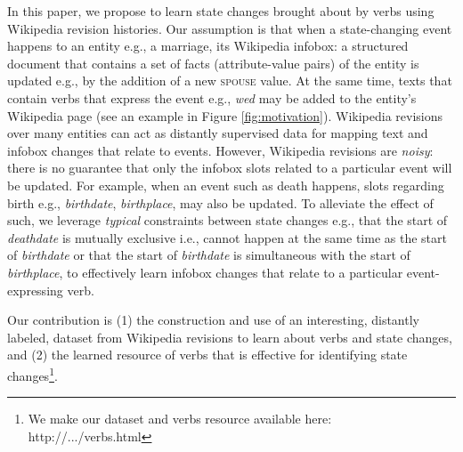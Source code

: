 In this paper, we propose to learn state changes brought about by verbs using Wikipedia revision histories. Our assumption is that when a state-changing event happens to an entity e.g., a marriage, its Wikipedia infobox: a structured document that contains a set of facts (attribute-value pairs) of the entity is updated e.g., by the addition of a new \textsc{spouse} value. At the same time, texts that contain verbs that express the event e.g., \textit{wed} may be added to the entity's Wikipedia page (see an example in Figure \ref{fig:motivation}). Wikipedia revisions over many entities can act as distantly supervised data for mapping text and infobox changes that relate to events. However, Wikipedia revisions are \textit{noisy}: there is no guarantee that only the infobox slots related to a particular event will be updated. For example, when an event such as death happens, slots regarding birth e.g., \textit{birthdate}, \textit{birthplace}, may also be updated. To alleviate the effect of such, we leverage \textit{typical} constraints between state changes e.g., that the start of \textit{deathdate} is mutually exclusive i.e., cannot happen at the same time as the start of \textit{birthdate} or that the start of \textit{birthdate} is simultaneous with the start of \textit{birthplace}, to effectively learn infobox changes that relate to a particular event-expressing verb. 

Our contribution is (1) the construction and use of an interesting, distantly labeled, dataset from Wikipedia revisions to learn about verbs and state changes, and (2) the learned resource of verbs that is effective for identifying state changes\footnote[1]{We make our dataset and verbs resource available here: http://.../verbs.html}.